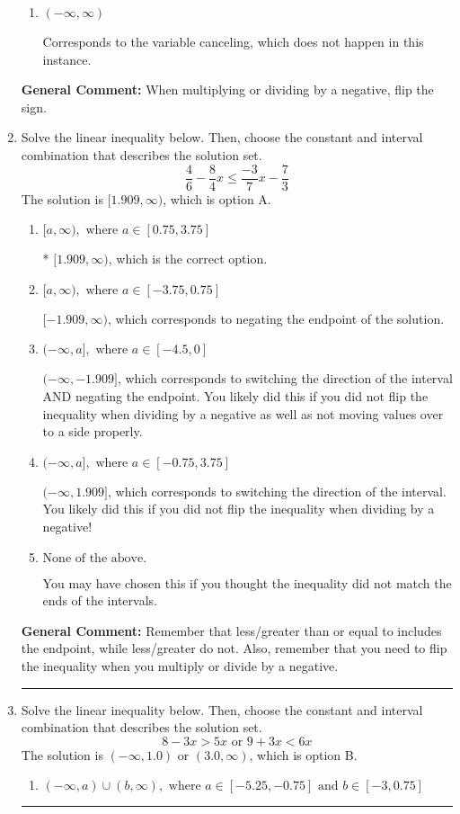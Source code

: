\documentclass{extbook}[14pt]
\newcommand{\litem}[1]{\item #1

\rule{\textwidth}{0.4pt}}
\begin{document}
\begin{enumerate}
{\begin{enumerate}[label=\Alph*.]
Corresponds to inverting the inequality and negating the solution.
\item \( (-\infty, \infty) \)

Corresponds to the variable canceling, which does not happen in this instance.
\end{enumerate}

\textbf{General Comment:} When multiplying or dividing by a negative, flip the sign.
}
\litem{
Solve the linear inequality below. Then, choose the constant and interval combination that describes the solution set.
\[ \frac{4}{6} - \frac{8}{4} x \leq \frac{-3}{7} x - \frac{7}{3} \]The solution is \( [1.909, \infty) \), which is option A.\begin{enumerate}[label=\Alph*.]
\item \( [a, \infty), \text{ where } a \in [0.75, 3.75] \)

* $[1.909, \infty)$, which is the correct option.
\item \( [a, \infty), \text{ where } a \in [-3.75, 0.75] \)

 $[-1.909, \infty)$, which corresponds to negating the endpoint of the solution.
\item \( (-\infty, a], \text{ where } a \in [-4.5, 0] \)

 $(-\infty, -1.909]$, which corresponds to switching the direction of the interval AND negating the endpoint. You likely did this if you did not flip the inequality when dividing by a negative as well as not moving values over to a side properly.
\item \( (-\infty, a], \text{ where } a \in [-0.75, 3.75] \)

 $(-\infty, 1.909]$, which corresponds to switching the direction of the interval. You likely did this if you did not flip the inequality when dividing by a negative!
\item \( \text{None of the above}. \)

You may have chosen this if you thought the inequality did not match the ends of the intervals.
\end{enumerate}

\textbf{General Comment:} Remember that less/greater than or equal to includes the endpoint, while less/greater do not. Also, remember that you need to flip the inequality when you multiply or divide by a negative.
}
\litem{
Solve the linear inequality below. Then, choose the constant and interval combination that describes the solution set.
\[ 8 - 3 x > 5 x \text{ or } 9 + 3 x < 6 x \]The solution is \( (-\infty, 1.0) \text{ or } (3.0, \infty) \), which is option B.\begin{enumerate}[label=\Alph*.]
\item \( (-\infty, a) \cup (b, \infty), \text{ where } a \in [-5.25, -0.75] \text{ and } b \in [-3, 0.75] \)


\end{enumerate}}
\end{enumerate}
\end{document}
